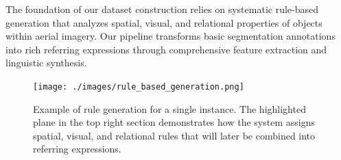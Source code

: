 The foundation of our dataset construction relies on systematic rule-based generation that analyzes spatial, visual, and relational properties of objects within aerial imagery. Our pipeline transforms basic segmentation annotations into rich referring expressions through comprehensive feature extraction and linguistic synthesis.

\begin{figure}[H]
\centering
\begin{minipage}{0.5\textwidth}
\centering
\texttt{[image: ./images/rule\_based\_generation.png]}
\end{minipage}%
\begin{minipage}{0.5\textwidth}
\centering
\hspace{-1cm}
\end{minipage}
\caption{Example of rule generation for a single instance. The highlighted plane in the top right section demonstrates how the system assigns spatial, visual, and relational rules that will later be combined into referring expressions.}
\label{fig:rule_example}
\end{figure}

